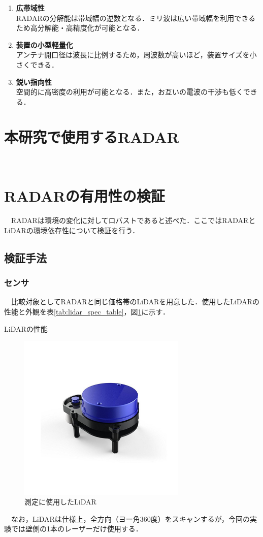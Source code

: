 \begin{enumerate}
    \item \textbf{広帯域性}\\
        RADARの分解能は帯域幅の逆数となる．ミリ波は広い帯域幅を利用できるため高分解能・高精度化が可能となる．
    \item \textbf{装置の小型軽量化}\\
        アンテナ開口径は波長に比例するため，周波数が高いほど，装置サイズを小さくできる．
    \item \textbf{鋭い指向性}\\
        空間的に高密度の利用が可能となる．また，お互いの電波の干渉も低くできる．
\end{enumerate}


\section{本研究で使用するRADAR}
　

\section{RADARの有用性の検証}
　RADARは環境の変化に対してロバストであると述べた．ここではRADARとLiDARの環境依存性について検証を行う．

\subsection{検証手法}
\subsubsection{センサ}
　比較対象としてRADARと同じ価格帯のLiDARを用意した．使用したLiDARの性能と外観を表\ref{tab:lidar_spec_table}，図\ref{fig:lidar}に示す．\cite{lidar_datasheet}

\begin{table}[htbp]
    \centering
    \caption{LiDARの性能}
    
    \label{tab:lidar_spec_table}
\end{table}

\begin{figure}[H]
    \centering
    \includegraphics[width=8cm]{./fig/lidar.jpg}
    \caption{測定に使用したLiDAR}
    \label{fig:lidar}
\end{figure}
　なお，LiDARは仕様上，全方向（ヨー角360度）をスキャンするが，今回の実験では壁側の1本のレーザーだけ使用する．

